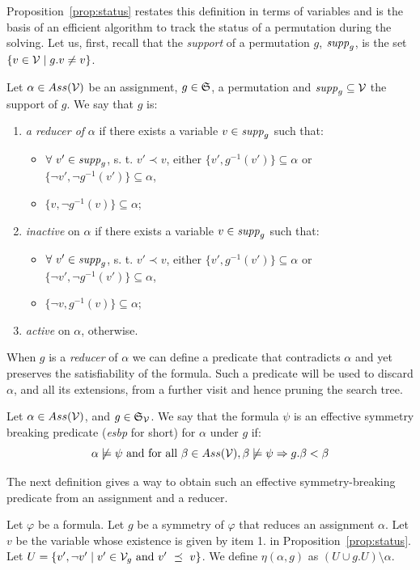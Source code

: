 Proposition~\ref{prop:status} restates this definition in terms of variables
and is the basis of an efficient algorithm to track the status of a
permutation during the solving. Let us, first, recall that the \emph{support}
 of a permutation $g$, $\mathit{supp}_g$, is the set $\{ v \in \mathcal{V} \mid g.v \neq v\}$.
 \clearpage 
\begin{proposition}
 \label{prop:status}
 Let $\alpha \in Ass(\mathcal{V})$ be an assignment, $g \in \mathfrak{S}$, a permutation and $ \mathit{supp}_g \subseteq  \mathcal{V}$ the support of $g$. We say that $g$ is:
 \begin{enumerate}
  \item  \emph{a reducer of} $\alpha$  if there exists a variable $v \in \mathit{supp}_g$
  such that:
  \begin{itemize}
   \item $\forall\ v' \in \mathit{supp}_g$, s. t. $v' \prec v$, either $\{v', g^{-1}(v')\}\subseteq\alpha $ or $\{\neg v', \neg g^{-1}(v')\} \subseteq \alpha $,
   \item $\{v, \neg g^{-1}(v)\} \subseteq \alpha$;
  \end{itemize}
  \item  \emph{inactive} on $\alpha$  if there exists a variable $v \in \mathit{supp}_g$
  such that:
  \begin{itemize}
   \item $\forall\ v' \in \mathit{supp}_g$, s. t. $v' \prec v$, either $\{v', g^{-1}(v')\}\subseteq\alpha $ or $\{\neg v', \neg g^{-1}(v')\} \subseteq \alpha $,
   \item $\{\neg v, g^{-1}(v)\} \subseteq \alpha$;
  \end{itemize}
  \item  \emph{active} on $\alpha$, otherwise.
 \end{enumerate}
\end{proposition}


When $g$ is a \textit{reducer} of $\alpha$ we can define a predicate that contradicts $\alpha$ and yet preserves the satisfiability of the formula. Such a predicate will be used to discard $\alpha$, and all its extensions, from a further visit and hence pruning the search tree.
\begin{definition}
 \label{def:esbp}
 Let $\alpha \in Ass(\mathcal{V})$, and $g \in \mathfrak{S}_{\mathcal{V}}$.
 We say that the formula $\psi$ is an effective symmetry breaking predicate (\textit{esbp} for short) for $\alpha$ under $g$ if:
 $$\alpha \not\models \psi \text{ and for all }\beta \in Ass(\mathcal{V}), \beta \not\models \psi \Rightarrow g.\beta < \beta$$
\end{definition}
The next definition gives a way to obtain such an effective symmetry-breaking predicate from an assignment and a reducer.
\begin{definition}\label{def:eta}
 Let $\varphi$ be a formula.
 Let $g$ be a symmetry of $\varphi$ that reduces an assignment $\alpha$.
 Let $v$ be the variable whose existence is given by item 1. in Proposition~\ref{prop:status}.
 Let $U = \{ v', \neg v' \mid v' \in \mathcal{V}_g \text{ and } v'~\preceq~v\}$.
 We define $\eta(\alpha, g)$ as $(U \cup g.U) \setminus \alpha$.
\end{definition}

